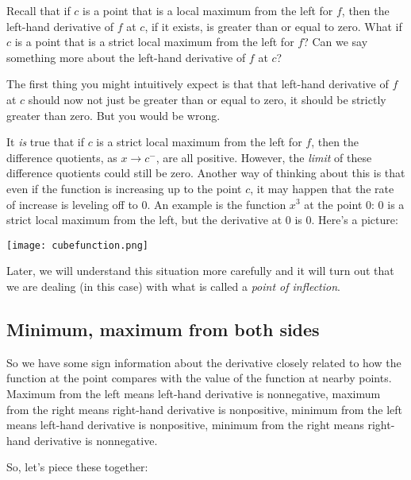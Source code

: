 \documentclass{amsart}
\begin{document}
Recall that if $c$ is a point that is a local maximum from the left
for $f$, then the left-hand derivative of $f$ at $c$, if it exists, is
greater than or equal to zero. What if $c$ is a point that is a strict
local maximum from the left for $f$? Can we say something more about
the left-hand derivative of $f$ at $c$?

The first thing you might intuitively expect is that that left-hand
derivative of $f$ at $c$ should now not just be greater than or equal
to zero, it should be strictly greater than zero. But you would be
wrong.

It {\em is} true that if $c$ is a strict local maximum from the left
for $f$, then the difference quotients, as $x \to c^-$, are all
positive. However, the {\em limit} of these difference quotients could
still be zero. Another way of thinking about this is that even if the
function is increasing up to the point $c$, it may happen that the
rate of increase is leveling off to $0$. An example is the function
$x^3$ at the point $0$: $0$ is a strict local maximum from the left,
but the derivative at $0$ is $0$. Here's a picture:

\texttt{[image: cubefunction.png]}

Later, we will understand this situation more carefully and it will
turn out that we are dealing (in this case) with what is called a {\em
point of inflection}.

\subsection{Minimum, maximum from both sides}

So we have some sign information about the derivative closely related
to how the function at the point compares with the value of the
function at nearby points. Maximum from the left means left-hand
derivative is nonnegative, maximum from the right means right-hand
derivative is nonpositive, minimum from the left means left-hand
derivative is nonpositive, minimum from the right means right-hand
derivative is nonnegative.

So, let's piece these together:
\end{document}
